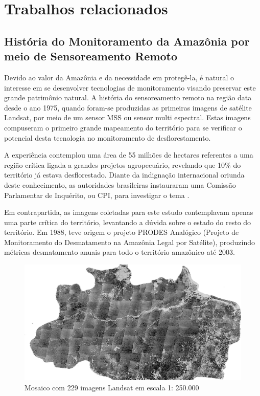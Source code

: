 \chapter{Trabalhos relacionados}
\label{relacionados}

\section{História do Monitoramento da Amazônia por meio de Sensoreamento Remoto}

Devido ao valor da Amazônia e da necessidade em protegê-la, é natural o interesse em se desenvolver tecnologias de monitoramento visando preservar este grande patrimônio natural. A história do sensoreamento remoto na região data desde o ano 1975, quando foram-se produzidas as primeiras imagens de satélite Landsat, por meio de um sensor MSS ou sensor multi espectral.  Estas imagens compuseram o primeiro grande mapeamento do território para se verificar o potencial desta tecnologia no monitoramento de desflorestamento.

A experiência contemplou uma área de 55 milhões de hectares referentes a uma região crítica ligada a grandes projetos agropecuário, revelando que 10\% do território já estava desflorestado. Diante da indignação internacional oriunda deste conhecimento, as autoridades brasileiras instauraram uma Comissão Parlamentar de Inquérito, ou CPI, para investigar o tema \cite{hist_amz}. 

Em contrapartida, as imagens coletadas para este estudo contemplavam apenas uma parte crítica do território, levantando a dúvida sobre o estado do resto do território. Em 1988, teve origem o projeto PRODES Analógico (Projeto de Monitoramento do Desmatamento na Amazônia Legal por Satélite), produzindo métricas desmatamento anuais para todo o território amazônico até 2003.

\begin{figure}[htb]
	\centering
	\begin{minipage}{0.9\linewidth}
		\centering
		\includegraphics[width=\linewidth]{tg1/figuras/amazon.png}
		\caption{Mosaico com 229 imagens Landsat em escala 1: 250.000 \cite{hist_amz}} \label{fig:amz1988}
	\end{minipage}
\end{figure}

